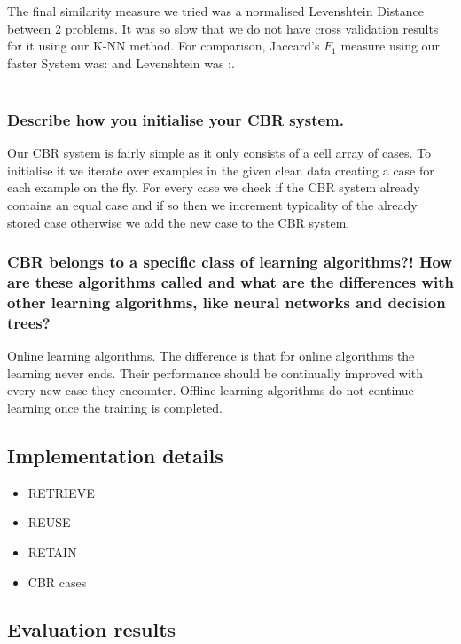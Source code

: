 \documentclass[12pt]{article}
\begin{document}
The final similarity measure we tried was a normalised Levenshtein Distance between 2 problems. It was so slow that we do not have cross validation results for it using our K-NN method. For comparison, Jaccard's $F_1$ measure using our faster System was: and Levenshtein was :. \\ \\



\subsubsection*{Describe how you initialise your CBR system.}

Our CBR system is fairly simple as it only consists of a cell array of cases. To initialise it we iterate over examples in the given clean data creating a case for each example on the fly. For every case we check if the CBR system already contains an equal case and if so then we increment typicality of the already stored case otherwise we add the new case to the CBR system.

\subsubsection*{CBR belongs to a specific class of learning algorithms?! How are these algorithms called and what are the differences with other learning algorithms, like neural networks and decision trees?}

Online learning algorithms. The difference is that for online algorithms the learning never ends. Their performance should be continually improved with every new case they encounter. Offline learning algorithms do not continue learning once the training is completed.


\subsection*{Implementation details}
\begin{itemize}
  \item RETRIEVE
  \item REUSE
  \item RETAIN
  \item CBR cases
\end{itemize}


\subsection*{Evaluation results}
\end{document}

